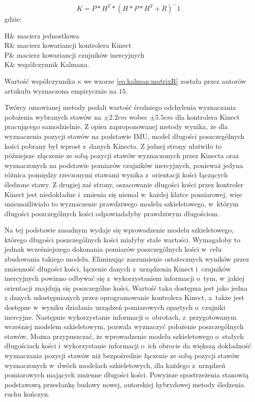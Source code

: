 \begin{equation}
	K = P * H^T * (H * P * H^T +R)^-1
	\label{eq:kalman:gain}
\end{equation}
gdzie:
\begin{conditions}
	H& macierz jednostkowa\\
	R& macierz kowariancji kontrolera Kinect\\
	P& macierz kowariancji czujników inercyjnych\\
	K& współczynnik Kalmana.
\end{conditions}
																																																			
Wartość współczynnika $\kappa$ we wzorze \ref{eq:kalman:matrixR} została przez autorów artukułu wyznaczona empirycznie na $15$.
																																																			
Twórcy omawianej metody podali wartość średniego odchylenia wyznaczania położenia wybranych stawów na $\pm 2.2cm$ wobec $\pm 5.5cm$ dla kontrolera Kinect pracującego samodzielnie. Z opisu zaproponowanej metody wynika, że dla wyznaczenia pozycji stawów na podstawie IMU, model długości poszczególnych kości pobrany był wprost z~danych Kinecta. Z jednej strony ułatwiło to późniejsze złączenie ze sobą pozycji stawów wyznaczonych przez Kinecta oraz wyznaczonych na podstawie pomiarów czujników inercyjnych, ponieważ jedyna różnica pomiędzy rzeczonymi stawami wynika z~orientacji kości łączących śledzone stawy. Z drugiej zaś strony, oszacowanie długości kości przez kontroler Kinect jest niedokładne i~zmienia się niemal w~każdej klatce pomiarowej, więc uniemożliwiało to wyznaczenie prawdziwego modelu szkieletowego, w~którym długości poszczególnych kości odpowiadałyby prawdziwym długościom.
				
Na tej podstawie zasadnym wydaje się wprowadzenie modelu szkieletowego, którego długości poszczególnych kości miałyby stałe wartości. Wymagałoby to jednak wcześniejszego dokonania pomiarów poszczególnych kości w~celu zbudowania takiego modelu. Eliminując zaszumienie ostatecznych wyników przez zmienność długości kości, łączenie danych z~urządzenia Kinect i~czujników inercyjnych powinno odbywać się z~wykorzystaniem informacji o~tym, w~jakiej orientacji znajdują się poszczególne kości. Wartość taka dostępna jest jako jedna z danych udostępnianych przez oprogramowanie kontrolera Kinect, a~także jest dostępne w~wyniku działania urządzeń pomiarowych opartych o~czujniki inercyjne. Następnie wykorzystanie informacji o~obrotach, z~przygotowanym wcześniej modelem szkieletowym, pozwala wyznaczyć położenie poszczególnych stawów. Można przypuszczać, że wprowadzenie modelu szkieletowego o~stałych długościach kości i~wykorzystanie informacji o~ich obrocie da większą dokładność wyznaczania pozycji stawów niż bezpośrednie łączenie ze sobą pozycji stawów wyznaczonych w~dwóch modelach szkieletowych, dla każdego z~urządzeń pomiarowych mających zmienne długości kości. Powyższe spostrzeżenia stanowią podstawową przesłankę budowy nowej, autorskiej hybrydowej metody śledzenia ruchu kończyn.